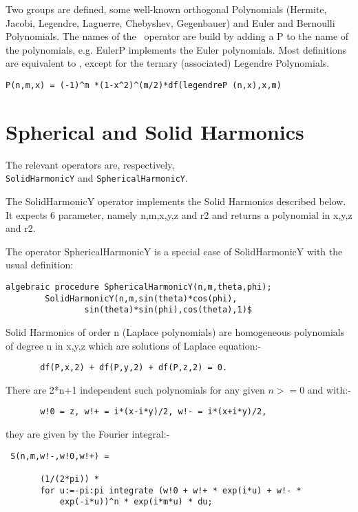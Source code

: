 \documentclass[11pt]{article}
\begin{document}
Two groups are defined, some well-known orthogonal Polynomials
(Hermite, Jacobi, Legendre, Laguerre, Chebyshev, Gegenbauer)
and Euler and Bernoulli Polynomials.
The names of the \REDUCE\  operator are build by adding a P
to the name
of the polynomials, e.g. EulerP implements the Euler polynomials.
Most definitions are equivalent to \cite{Abramowitz:72}, except
for the ternary (associated) Legendre Polynomials.

\begin{verbatim}
P(n,m,x) = (-1)^m *(1-x^2)^(m/2)*df(legendreP (n,x),x,m)
\end{verbatim}

\section{Spherical and Solid Harmonics}
 
 
The relevant operators are, respectively,\\
{\tt SolidHarmonicY} and {\tt SphericalHarmonicY}.

The SolidHarmonicY operator implements the Solid Harmonics
described below. It expects 6 parameter, namely n,m,x,y,z and r2
and returns a polynomial in x,y,z and r2.

The operator
SphericalHarmonicY is a special case of SolidHarmonicY
with the usual definition:

\begin{verbatim}
algebraic procedure SphericalHarmonicY(n,m,theta,phi);
        SolidHarmonicY(n,m,sin(theta)*cos(phi),
                sin(theta)*sin(phi),cos(theta),1)$
\end{verbatim}


Solid Harmonics of order n (Laplace polynomials)
are homogeneous polynomials of degree n in x,y,z
which are solutions of Laplace equation:-

\begin{verbatim}
       df(P,x,2) + df(P,y,2) + df(P,z,2) = 0.
\end{verbatim}

There are 2*n+1 independent such polynomials for any given $n >=0$
and with:-

\begin{verbatim}
       w!0 = z, w!+ = i*(x-i*y)/2, w!- = i*(x+i*y)/2,
\end{verbatim}

they are given by the Fourier integral:-

\begin{verbatim}
 S(n,m,w!-,w!0,w!+) =

       (1/(2*pi)) *
       for u:=-pi:pi integrate (w!0 + w!+ * exp(i*u) + w!- *
           exp(-i*u))^n * exp(i*m*u) * du;
\end{verbatim}
\end{document}
